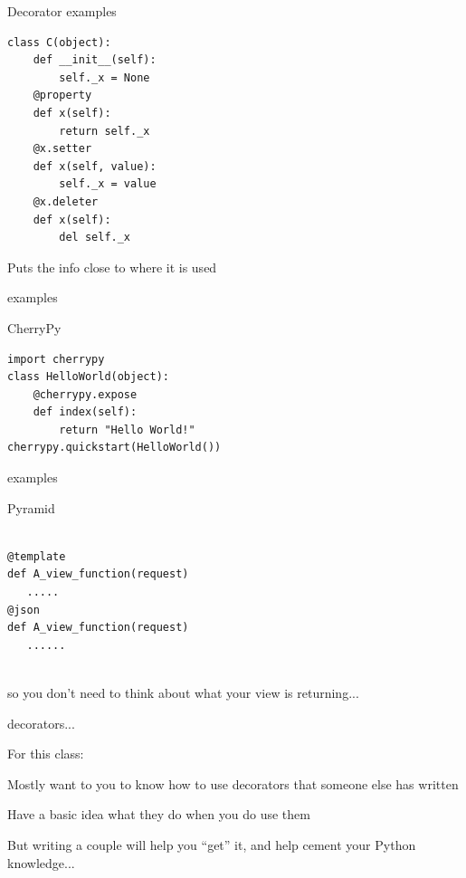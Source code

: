 \documentclass{beamer}
\begin{document}
\begin{frame}[fragile]{Decorator examples}

\begin{verbatim}
class C(object):
    def __init__(self):
        self._x = None
    @property
    def x(self):
        return self._x
    @x.setter
    def x(self, value):
        self._x = value
    @x.deleter
    def x(self):
        del self._x
\end{verbatim}

\vfill
{\large Puts the info close to where it is used}
\end{frame} 

\begin{frame}[fragile]{examples}

{\LARGE CherryPy}

\vfill
\begin{verbatim}
import cherrypy
class HelloWorld(object):
    @cherrypy.expose
    def index(self):
        return "Hello World!"
cherrypy.quickstart(HelloWorld())
\end{verbatim}

\end{frame} 

\begin{frame}[fragile]{examples}

{\LARGE Pyramid}

\vfill
\begin{verbatim}

@template
def A_view_function(request)
   .....
@json
def A_view_function(request)
   ......


\end{verbatim}

so you don't need to think about what your view is returning...

\end{frame} 


\begin{frame}[fragile]{decorators...}

{\Large For this class:}

\vfill
{\Large Mostly want to you to know how to use decorators that someone else has written}

\vfill
{\Large Have a basic idea what they do when you do use them}

\vfill
{\Large But writing a couple will help you ``get'' it, and help cement your Python knowledge...}


\end{frame} 
\end{document}
